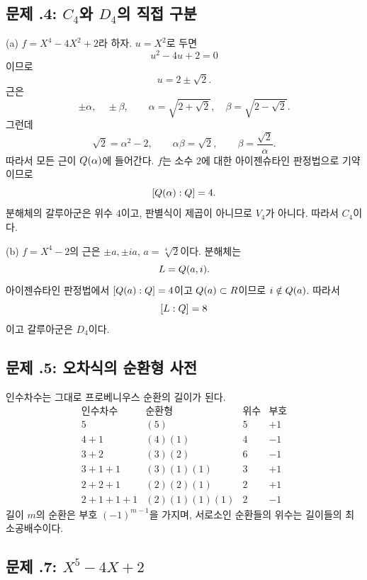 \subsection*{문제 \thechapter.4: $C_4$와 $D_4$의 직접 구분}

\begin{solution}
(a) $f=X^4-4X^2+2$라 하자. $u=X^2$로 두면
\[
  u^2-4u+2=0
\]
이므로
\[
  u=2\pm\sqrt2.
\]
근은
\[
  \pm\alpha,\quad\pm\beta,
  \qquad
  \alpha=\sqrt{2+\sqrt2},\quad
  \beta=\sqrt{2-\sqrt2}.
\]
그런데
\[
  \sqrt2=\alpha^2-2,
  \qquad
  \alpha\beta=\sqrt2,
  \qquad
  \beta=\frac{\sqrt2}{\alpha}.
\]
따라서 모든 근이 $Q(\alpha)$에 들어간다. $f$는 소수 $2$에 대한 아이젠슈타인 판정법으로 기약이므로
\[
  [Q(\alpha):Q]=4.
\]
분해체의 갈루아군은 위수 $4$이고, 판별식이 제곱이 아니므로 $V_4$가 아니다. 따라서 $C_4$이다.

(b) $f=X^4-2$의 근은 $\pm a,\pm ia$, $a=\sqrt[4]2$이다. 분해체는
\[
  L=Q(a,i).
\]
아이젠슈타인 판정법에서 $[Q(a):Q]=4$이고 $Q(a)\subset R$이므로 $i\notin Q(a)$. 따라서
\[
  [L:Q]=8
\]
이고 갈루아군은 $D_4$이다.
\end{solution}

\subsection*{문제 \thechapter.5: 오차식의 순환형 사전}

\begin{solution}
인수차수는 그대로 프로베니우스 순환의 길이가 된다.
\[
\begin{array}{c|c|c|c}
\text{인수차수} & \text{순환형} & \text{위수} & \text{부호}\\
\hline
5&(5)&5&+1\\
4+1&(4)(1)&4&-1\\
3+2&(3)(2)&6&-1\\
3+1+1&(3)(1)(1)&3&+1\\
2+2+1&(2)(2)(1)&2&+1\\
2+1+1+1&(2)(1)(1)(1)&2&-1
\end{array}
\]
길이 $m$의 순환은 부호 $(-1)^{m-1}$을 가지며, 서로소인 순환들의 위수는 길이들의 최소공배수이다.
\end{solution}

\subsection*{문제 \thechapter.7: $X^5-4X+2$}

